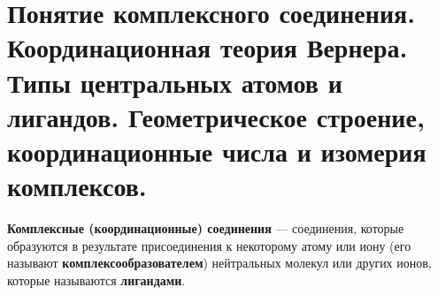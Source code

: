 \section{Понятие комплексного соединения. Координационная теория Вернера. Типы центральных атомов и лигандов. Геометрическое строение, координационные числа и изомерия комплексов.}

\textbf{Комплексные (координационные) соединения} --- соединения, которые образуются в результате присоединения к некоторому атому или иону (его называют \textbf{комплексообразователем}) нейтральных молекул или других ионов, которые называются \textbf{лигандами}.
